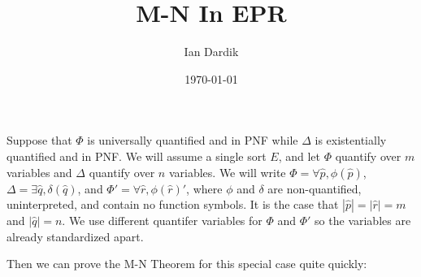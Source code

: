 \documentclass[12pt]{article}
\title{M-N In EPR}
\author{Ian Dardik}
\date{\today}
\theoremstyle{definition}
\theoremstyle{remark}
\begin{document}
\maketitle

Suppose that $\Phi$ is universally quantified and in PNF while $\Delta$ is existentially quantified and in PNF.  We will assume a single sort $E$, and let $\Phi$ quantify over $m$ variables and $\Delta$ quantify over $n$ variables.  We will write $\Phi = \forall \hat{p}, \phi(\hat{p})$, $\Delta = \exists \hat{q}, \delta(\hat{q})$, and $\Phi' = \forall \hat{r}, \phi(\hat{r})'$, where $\phi$ and $\delta$ are non-quantified, uninterpreted, and contain no function symbols.  It is the case that $|\hat{p}| = |\hat{r}| = m$ and $|\hat{q}| = n$.  We use different quantifer variables for $\Phi$ and $\Phi'$ so the variables are already standardized apart.

Then we can prove the M-N Theorem for this special case quite quickly:
\end{document}
